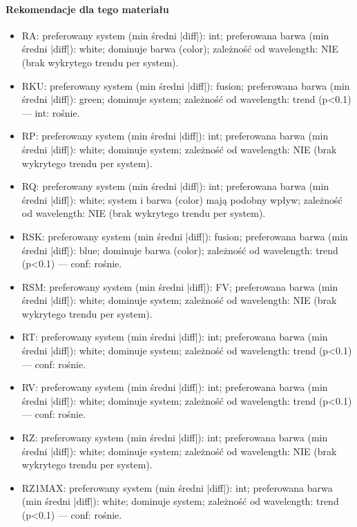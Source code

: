 \documentclass[
  10pt,
]{article}
\begin{document}
\paragraph{Rekomendacje dla tego materiału}
\begin{itemize}
\item RA: preferowany system (min średni |diff|): int; preferowana barwa (min średni |diff|): white; dominuje barwa (color); zależność od wavelength: NIE (brak wykrytego trendu per system).
\item RKU: preferowany system (min średni |diff|): fusion; preferowana barwa (min średni |diff|): green; dominuje system; zależność od wavelength: trend (p<0.1) — int: rośnie.
\item RP: preferowany system (min średni |diff|): int; preferowana barwa (min średni |diff|): white; dominuje system; zależność od wavelength: NIE (brak wykrytego trendu per system).
\item RQ: preferowany system (min średni |diff|): int; preferowana barwa (min średni |diff|): white; system i barwa (color) mają podobny wpływ; zależność od wavelength: NIE (brak wykrytego trendu per system).
\item RSK: preferowany system (min średni |diff|): fusion; preferowana barwa (min średni |diff|): blue; dominuje barwa (color); zależność od wavelength: trend (p<0.1) — conf: rośnie.
\item RSM: preferowany system (min średni |diff|): FV; preferowana barwa (min średni |diff|): white; dominuje system; zależność od wavelength: NIE (brak wykrytego trendu per system).
\item RT: preferowany system (min średni |diff|): int; preferowana barwa (min średni |diff|): white; dominuje system; zależność od wavelength: trend (p<0.1) — conf: rośnie.
\item RV: preferowany system (min średni |diff|): int; preferowana barwa (min średni |diff|): white; dominuje system; zależność od wavelength: trend (p<0.1) — conf: rośnie.
\item RZ: preferowany system (min średni |diff|): int; preferowana barwa (min średni |diff|): white; dominuje system; zależność od wavelength: NIE (brak wykrytego trendu per system).
\item RZ1MAX: preferowany system (min średni |diff|): int; preferowana barwa (min średni |diff|): white; dominuje system; zależność od wavelength: trend (p<0.1) — conf: rośnie.
\end{itemize}
\end{document}
